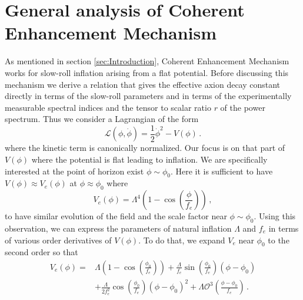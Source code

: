 \documentclass[12pt]{article}
\begin{document}
\section{General analysis of Coherent Enhancement Mechanism \label{sec:CoherentEnhancement}}
As mentioned in section \ref{sec:Introduction}, Coherent Enhancement Mechanism works for slow-roll inflation arising from a flat potential.
Before discussing this mechanism we derive a relation that gives the effective axion decay constant directly in terms of the slow-roll parameters and in terms of the experimentally measurable spectral indices and the tensor to scalar ratio $r$ of the power spectrum.
Thus we consider a Lagrangian of the form
\begin{equation}
  \mathcal{L}\left(\phi, \dot{\phi}\right) = \frac{1}{2}{\dot{\phi}}^2 - V\left(\phi\right)\,.
\end{equation}
where the kinetic term is canonically normalized.
Our focus is on that part of $V\left(\phi\right)$ where the potential is flat leading to inflation.
We are specifically interested at the point of horizon exist $\phi \sim \phi_0$.
Here it is sufficient to have $V\left(\phi\right) \approx V_{e}\left(\phi\right)$ at $\phi \approx \phi_0$ where
\begin{equation} \label{eq:naturalInflationPotential}
  V_e\left(\phi\right) = \Lambda^4 \left(1 - \cos\left(\frac{\phi}{f_e}\right)\right)\,,
\end{equation}
to have similar evolution of the field and the scale factor near $\phi \sim \phi_0$.
Using this observation, we can express the parameters of natural inflation $\Lambda$ and $f_e$ in terms of various order derivatives of $V\left(\phi\right)$.
To do that, we expand $V_{e}$ near $\phi_0$ to the second order so that
\begin{equation} \label{eq:naturalInflationSeries}
  \begin{aligned}
    V_{e}\left(\phi\right) =
      &\Lambda \left(1 - \cos\left(\frac{\phi_0}{f_e}\right)\right)
        + \frac{\Lambda}{f_e} \sin\left(\frac{\phi_0}{f_e}\right) \left(\phi - \phi_0\right)\\
      & + \frac{\Lambda}{2 f_e^2} \cos\left(\frac{\phi_0}{f_e}\right) \left(\phi - \phi_0\right)^2
        + \Lambda \mathcal{O}^3\left(\frac{\phi - \phi_0}{f_e}\right)\,.
  \end{aligned}
\end{equation}
\end{document}
